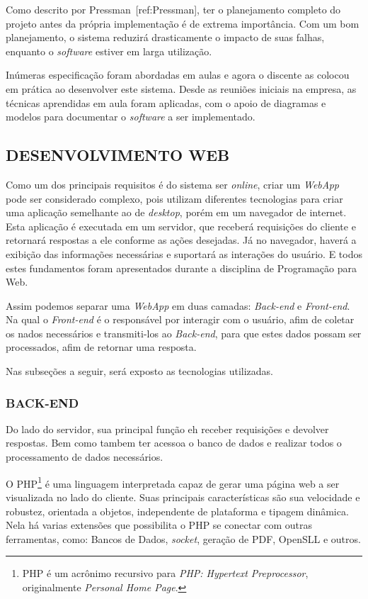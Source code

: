 \documentclass[
  12pt,				%
  openany,
  oneside,
  a4paper,			%
  english,			%
  brazil
]{article}
\numberwithin{figure}{section}
\numberwithin{table}{section}
\newcounter{subsubsubsection}[subsubsection]
\begin{document}
Como descrito por Pressman~[ref:Pressman], ter o planejamento completo do projeto antes da própria implementação é de extrema importância. Com um bom planejamento, o sistema reduzirá drasticamente o impacto de suas falhas, enquanto o \textit{software} estiver em larga utilização.

Inúmeras especificação foram abordadas em aulas e agora o discente as colocou em prática ao desenvolver este sistema. Desde as reuniões iniciais na empresa, as técnicas aprendidas em aula foram aplicadas, com o apoio de diagramas e modelos para documentar o \textit{software} a ser implementado.


\subsection{DESENVOLVIMENTO WEB}
Como um dos principais requisitos é do sistema ser \textit{online}, criar um \textit{WebApp} pode ser considerado complexo, pois utilizam diferentes tecnologias para criar uma aplicação semelhante ao de \textit{desktop}, porém em um navegador de internet. Esta aplicação é executada em um servidor, que receberá requisições do cliente e retornará respostas a ele conforme as ações desejadas. Já no navegador, haverá a exibição das informações necessárias e suportará as interações do usuário. E todos estes fundamentos foram apresentados durante a disciplina de Programação para Web.

Assim podemos separar uma \textit{WebApp} em duas camadas: \textit{Back-end} e \textit{Front-end}. Na qual o \textit{Front-end} é o responsável por interagir com o usuário, afim de coletar os nados necessários e transmiti-los ao \textit{Back-end}, para que estes dados possam ser processados, afim de retornar uma resposta.

Nas subseções a seguir, será exposto as tecnologias utilizadas.
 

\subsubsection{BACK-END}
Do lado do servidor, sua principal função eh receber requisições e devolver respostas. Bem como tambem ter acessoa o banco de dados e realizar todos o processamento de dados necessários.

O PHP\footnote{PHP é um acrônimo recursivo para \textit{PHP: Hypertext Preprocessor}, originalmente \textit{Personal Home Page}.} é uma linguagem interpretada capaz de gerar uma página web a ser visualizada no lado do cliente. Suas principais características são sua velocidade e robustez, orientada a objetos, independente de plataforma e tipagem dinâmica. Nela há varias extensões que possibilita o PHP se conectar com outras ferramentas, como: Bancos de Dados, \textit{socket}, geração de PDF, OpenSLL e outros.
\end{document}
